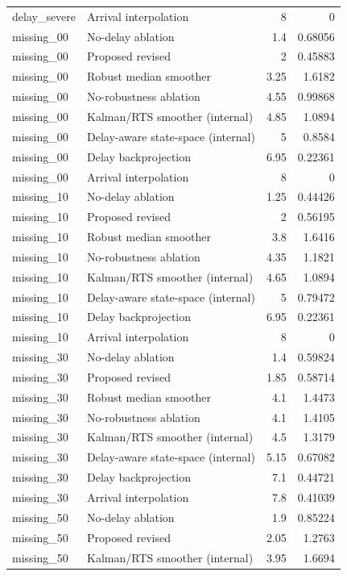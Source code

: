 \begin{table}[!htbp]
{\begin{tabular}{llrr}
delay_severe & Arrival interpolation & 8 & 0 \\
missing_00 & No-delay ablation & 1.4 & 0.68056 \\
missing_00 & Proposed revised & 2 & 0.45883 \\
missing_00 & Robust median smoother & 3.25 & 1.6182 \\
missing_00 & No-robustness ablation & 4.55 & 0.99868 \\
missing_00 & Kalman/RTS smoother (internal) & 4.85 & 1.0894 \\
missing_00 & Delay-aware state-space (internal) & 5 & 0.8584 \\
missing_00 & Delay backprojection & 6.95 & 0.22361 \\
missing_00 & Arrival interpolation & 8 & 0 \\
missing_10 & No-delay ablation & 1.25 & 0.44426 \\
missing_10 & Proposed revised & 2 & 0.56195 \\
missing_10 & Robust median smoother & 3.8 & 1.6416 \\
missing_10 & No-robustness ablation & 4.35 & 1.1821 \\
missing_10 & Kalman/RTS smoother (internal) & 4.65 & 1.0894 \\
missing_10 & Delay-aware state-space (internal) & 5 & 0.79472 \\
missing_10 & Delay backprojection & 6.95 & 0.22361 \\
missing_10 & Arrival interpolation & 8 & 0 \\
missing_30 & No-delay ablation & 1.4 & 0.59824 \\
missing_30 & Proposed revised & 1.85 & 0.58714 \\
missing_30 & Robust median smoother & 4.1 & 1.4473 \\
missing_30 & No-robustness ablation & 4.1 & 1.4105 \\
missing_30 & Kalman/RTS smoother (internal) & 4.5 & 1.3179 \\
missing_30 & Delay-aware state-space (internal) & 5.15 & 0.67082 \\
missing_30 & Delay backprojection & 7.1 & 0.44721 \\
missing_30 & Arrival interpolation & 7.8 & 0.41039 \\
missing_50 & No-delay ablation & 1.9 & 0.85224 \\
missing_50 & Proposed revised & 2.05 & 1.2763 \\
missing_50 & Kalman/RTS smoother (internal) & 3.95 & 1.6694 \\

\end{tabular}}
\end{table}
